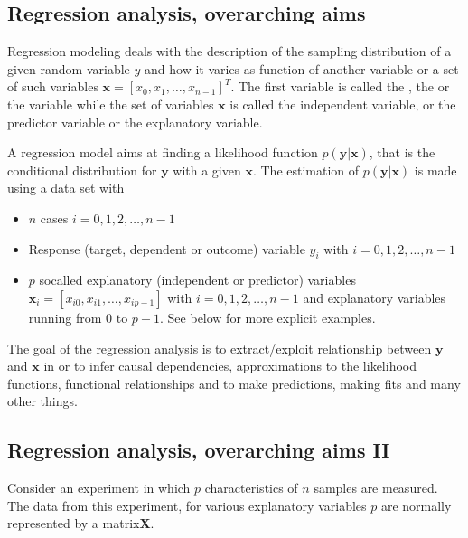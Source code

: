 \documentclass[letterpaper,10pt,english]{sphinxmanual}
\begin{document}
\subsection{Regression analysis, overarching aims}
\label{\detokenize{chapter4:regression-analysis-overarching-aims}}
Regression modeling deals with the description of  the sampling distribution of a given random variable \(y\) and how it varies as function of another variable or a set of such variables \(\boldsymbol{x} =[x_0, x_1,\dots, x_{n-1}]^T\).
The first variable is called the , the  or the  variable while the set of variables \(\boldsymbol{x}\) is called the independent variable, or the predictor variable or the explanatory variable.

A regression model aims at finding a likelihood function \(p(\boldsymbol{y}\vert \boldsymbol{x})\), that is the conditional distribution for \(\boldsymbol{y}\) with a given \(\boldsymbol{x}\). The estimation of  \(p(\boldsymbol{y}\vert \boldsymbol{x})\) is made using a data set with
\begin{itemize}
\item {} 
\(n\) cases \(i = 0, 1, 2, \dots, n-1\)

\item {} 
Response (target, dependent or outcome) variable \(y_i\) with \(i = 0, 1, 2, \dots, n-1\)

\item {} 
\(p\) so\sphinxhyphen{}called explanatory (independent or predictor) variables \(\boldsymbol{x}_i=[x_{i0}, x_{i1}, \dots, x_{ip-1}]\) with \(i = 0, 1, 2, \dots, n-1\) and explanatory variables running from \(0\) to \(p-1\). See below for more explicit examples.

\end{itemize}

The goal of the regression analysis is to extract/exploit relationship between \(\boldsymbol{y}\) and \(\boldsymbol{x}\) in or to infer causal dependencies, approximations to the likelihood functions, functional relationships and to make predictions, making fits and many other things.


\subsection{Regression analysis, overarching aims II}
\label{\detokenize{chapter4:regression-analysis-overarching-aims-ii}}
Consider an experiment in which \(p\) characteristics of \(n\) samples are
measured. The data from this experiment, for various explanatory variables \(p\) are normally represented by a matrix\(\mathbf{X}\).
\end{document}
